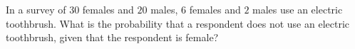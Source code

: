 In a survey of $30$ females and $20$ males, $6$ females and $2$ males use an electric toothbrush. What is the probability that a respondent does not use an electric toothbrush, given that the respondent is female?

